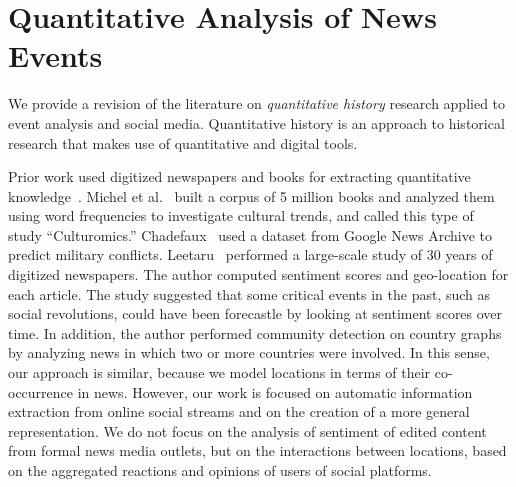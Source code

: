 




\section{Quantitative Analysis of News Events}

We provide a revision of the literature on {\em quantitative history} research
applied to event analysis and social media. 
%
Quantitative history is an approach to historical research that makes use of
quantitative and digital tools. 


Prior work used digitized newspapers and books for extracting quantitative
knowledge~\cite{Michel176,leetaru2011culturomics,chadefaux2014early}. 
%
Michel et al.~\cite{Michel176} built a corpus of 5 million books and analyzed
them using word frequencies to investigate cultural trends, and called this type
of study ``Culturomics.''
%
Chadefaux~\cite{chadefaux2014early} used a dataset from Google News Archive to
predict military conflicts.
%
Leetaru~\cite{leetaru2011culturomics} performed a large-scale study of 30 years
of digitized newspapers.
%
The author computed sentiment scores and geo-location for each article.
%
The study suggested that some critical events in the past, such as social
revolutions, could have been forecastle by looking at sentiment scores over
time.
%
In addition, the author performed community detection on country graphs by
analyzing news in which two or more countries were involved.  
%
In this sense, our approach is similar, because we model locations in terms of
their co-occurrence in news. 
%
However, our work is focused on automatic information extraction from online
social streams and on the creation of a more general representation.  
%
We do not focus on the analysis of sentiment of edited content from formal news
media outlets, but on the interactions between locations, based on the
aggregated reactions and opinions of users of social platforms.
%



